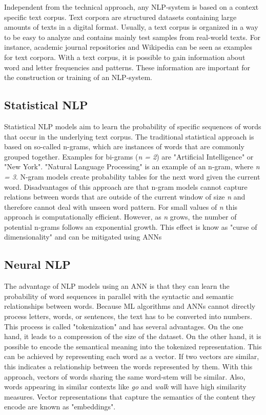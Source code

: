 Independent from the technical approach, any \ac{NLP}-system is based on a context specific text corpus. Text corpora are structured datasets containing large amounts of texts in a digital format. Usually, a text corpus is organized in a way to be easy to analyze and contains mainly test samples from real-world texts. For instance, academic journal repositories and Wikipedia can be seen as examples for text corpora. With a text corpus, it is possible to gain information about word and letter frequencies and patterns. These information are important for the construction or training of an \ac{NLP}-system.
\cite{church1995commercial,vzivzka2019text}

\subsection{Statistical NLP}
Statistical \ac{NLP} models aim to learn the probability of specific sequences of words that occur in the underlying text corpus.
The traditional statistical approach is based on so-called n-grams, which are instances of words that are commonly grouped together. Examples for bi-grams (\textit{n = 2}) are "Artificial Intelligence" or "New York". "Natural Language Processing" is an example of an n-gram, where \textit{n = 3}. N-gram models create probability tables for the next word given the current word. Disadvantages of this approach are that n-gram models cannot capture relations between words that are outside of the current window of size \textit{n} and therefore cannot deal with unseen word pattern. For small values of \textit{n} this approach is computationally efficient. However, as \textit{n} grows, the number of potential n-grams follows an exponential growth. This effect is know as "curse of dimensionality" and can be mitigated using \acp{ANN}
\cite{bengio,vzivzka2019text}

\subsection{Neural NLP}
The advantage of \ac{NLP} models using an \ac{ANN} is that they can learn the probability of word sequences in parallel with the syntactic and semantic relationships between words. 
Because \ac{ML} algorithms and \acp{ANN} cannot directly process letters, words, or sentences, the text has to be converted into numbers. This process is called "tokenization" and has several advantages. On the one hand, it leads to a compression of the size of the dataset. On the other hand, it is possible to encode the semantical meaning into the tokenized representation. This can be achieved by representing each word as a vector. If two vectors are similar, this indicates a relationship between the words represented by them. With this approach, vectors of words sharing the same word-stem will be similar. Also, words appearing in similar contexts like \textit{go} and \textit{walk} will have high similarity measures. Vector representations that capture the semantics of the content they encode are known as "embeddings".
\cite{bengio,vzivzka2019text}

